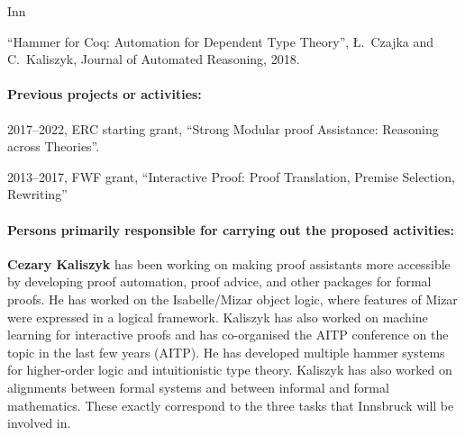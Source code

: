 \begin{sitedescription}{Inn}
\begin{compactitem}
\item ``Hammer for Coq: Automation for Dependent Type Theory'', Ł.~Czajka and C.~Kaliszyk, Journal of Automated Reasoning, 2018.
\end{compactitem}

\paragraph*{Previous projects or activities:}

\begin{compactitem}
\item 2017--2022, ERC starting grant, ``Strong Modular proof Assistance: Reasoning across Theories''.
\item 2013--2017, FWF grant, ``Interactive Proof: Proof Translation, Premise Selection, Rewriting''
\end{compactitem}




\paragraph*{Persons primarily responsible for carrying out the proposed activities:}

\begin{compactitem}
\item \textbf{Cezary Kaliszyk} has been working on making proof assistants
more accessible by developing proof automation, proof advice, and other packages for formal
proofs. He has worked on the Isabelle/Mizar object logic, where features of Mizar were
expressed in a logical framework. Kaliszyk has also worked on machine learning for interactive
proofs and has co-organised the AITP conference on the topic in the last few years (AITP). He
has developed multiple hammer systems for higher-order logic and intuitionistic type theory.
Kaliszyk has also worked on alignments between formal systems and between informal and formal
mathematics. These exactly correspond to the three tasks that Innsbruck will be involved in.
\end{compactitem}



\end{sitedescription}
